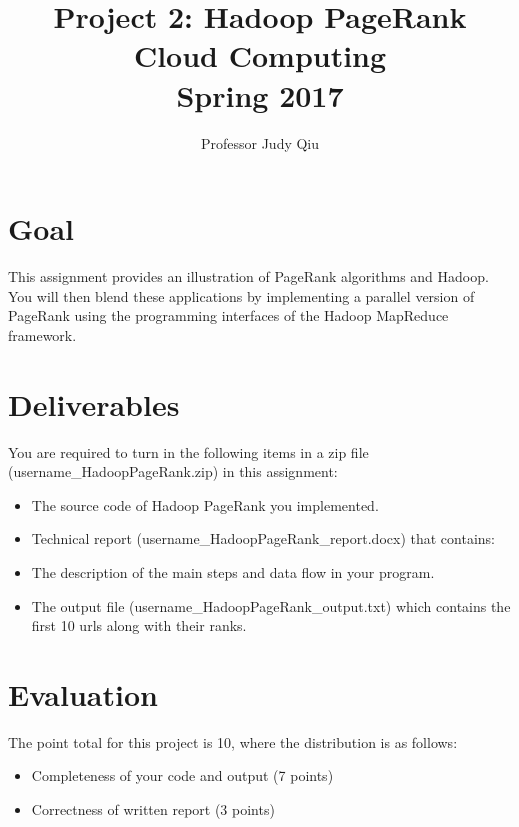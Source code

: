 \documentclass{article}
\begin{document}
\title{Project 2: Hadoop PageRank\\ Cloud Computing\\ Spring 2017}         %
\author{Professor Judy Qiu }        %
\date{}          %
\maketitle
\makeatother     %
\pagestyle{plain}
\section*{Goal}
 
This assignment provides an illustration of PageRank algorithms and Hadoop. You will then blend these applications by implementing a parallel version of PageRank using the programming interfaces of the Hadoop MapReduce framework. 


\section*{Deliverables}
You are required to turn in the following items in a zip file (username\_HadoopPageRank.zip) in this assignment: 
\begin{itemize}
\item The source code of Hadoop PageRank you implemented.
\item Technical report (username\_HadoopPageRank\_report.docx) that contains: 
\item The description of the main steps and data flow in your program. 
\item The output file (username\_HadoopPageRank\_output.txt) which contains the first 10 urls along with their ranks. 
\end{itemize}

\section*{Evaluation}
The point total for this project is 10, where the distribution is as follows:
\begin{itemize}
\item Completeness of your code and output (7 points)
\item Correctness of written report (3 points)
\end{itemize}
\end{document}
